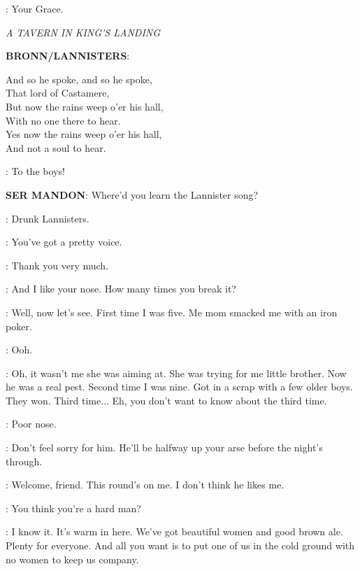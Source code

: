 \PYCELLE: Your Grace.


\scene

\textit{A TAVERN IN KING'S LANDING}


\textbf{BRONN/LANNISTERS}:  

    And so he spoke, and so he spoke, \\
    That lord of Castamere, \\
    But now the rains weep o'er his hall, \\
    With no one there to hear. \\
    Yes now the rains weep o'er his hall, \\
    And not a soul to hear.

\BRONN:  To the boys! 


\textbf{SER MANDON}: Where'd you learn the Lannister song? 

\BRONN: Drunk Lannisters. 


\WHORE: You've got a pretty voice. 

\BRONN: Thank you very much. 

\WHORE: And I like your nose. How many times you break it? 

\BRONN: Well, now let's see. First time I was five. Me mom smacked me with an iron poker. 

\WHORE: Ooh. 

\BRONN: Oh, it wasn't me she was aiming at. She was trying for me little brother. Now he was a real pest. Second time I was nine. Got in a scrap with a few older boys. They won. Third time$\ldots$  Eh, you don't want to know about the third time. 

\WHORE: Poor nose. 

\BRONN: Don't feel sorry for him. He'll be halfway up your arse before the night's through. 


\BRONN: Welcome, friend. This round's on me.  I don't think he likes me. 

\HOUND: You think you're a hard man? 

\BRONN: I know it. It's warm in here. We've got beautiful women and good brown ale. Plenty for everyone. And all you want is to put one of us in the cold ground with no women to keep us company. 

